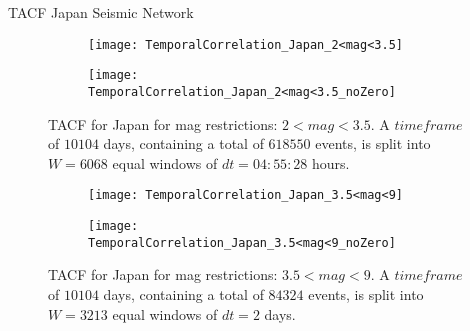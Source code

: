 \begin{frame}{TACF Japan Seismic Network}

\begin{figure}[!ht]
\begin{subfigure}{.5\textwidth}
  \centering
  \texttt{[image: TemporalCorrelation\_Japan\_2<mag<3.5]}
  \label{fig:corrJapan2_3.5}
\end{subfigure}%
\begin{subfigure}{.5\textwidth}
  \centering
  \texttt{[image: TemporalCorrelation\_Japan\_2<mag<3.5\_noZero]}
  \label{fig:corrJapan2_3.5_noZero}
\end{subfigure}
\caption{TACF for Japan for mag restrictions: $2<mag<3.5$. A $timeframe$ of $10104$ days, containing a total of $618550$ events, is split into $W=6068$ equal windows of $dt=04:55:28$ hours.}
\label{fig:corrJapan2_3.5!}
\end{figure}


\begin{figure}[!ht]
\begin{subfigure}{.5\textwidth}
  \centering
  \texttt{[image: TemporalCorrelation\_Japan\_3.5<mag<9]}
  \label{fig:corrJapan3.5_9}
\end{subfigure}%
\begin{subfigure}{.5\textwidth}
  \centering
  \texttt{[image: TemporalCorrelation\_Japan\_3.5<mag<9\_noZero]}
  \label{fig:corrJapan3.5_9_noZero}
\end{subfigure}
\caption{TACF for Japan for mag restrictions: $3.5<mag<9$. A $timeframe$ of $10104$ days, containing a total of $84324$ events, is split into $W=3213$ equal windows of $dt=2$ days.}
\label{fig:corrJapan3.5_9!}
\end{figure}
\end{frame}

\begin{comment}
\begin{frame}
By analyzing the TACFs for earthquakes with $2<magnitude<3.5$, the events can be interpreted as fluctuations that exhibit a chaotic behaviour and at larger magnitudes, above $3.5$, this behaviour is lost. Here, peaks are recognized at certain lags suggesting a correlation between events at certain time intervals. This can be an indication that large events are more likely than not to be separated by these time frames. For example, in Vrancea we recognize a couple of peaks at around $30$ lags, which would translate as $\sim 12.65$ years. This means that it is possible for some large events to have a $12.65$ years span between them.\par 
\end{frame}
\end{comment}
